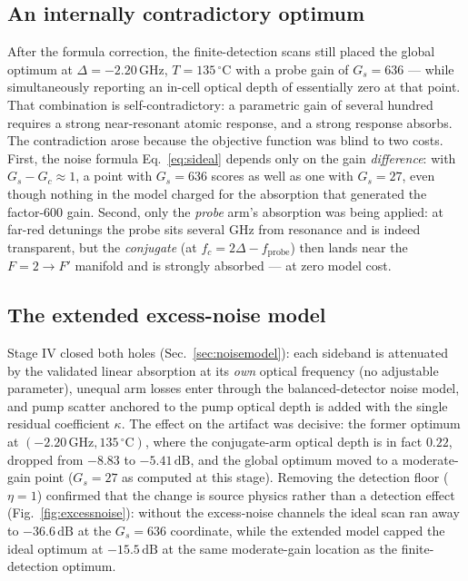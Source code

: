 \documentclass[11pt,a4paper]{article}
\newcommand{\dB}{\,\mathrm{dB}}
\newcommand{\GHz}{\,\mathrm{GHz}}
\newcommand{\degC}{\,^{\circ}\mathrm{C}}
\begin{document}
\subsection{An internally contradictory optimum}
After the formula correction, the finite-detection scans still placed the
global optimum at $\Delta=-2.20\GHz$, $T=135\degC$ with a probe gain of
$G_s=636$ --- while simultaneously reporting an in-cell optical depth of
essentially zero at that point. That combination is self-contradictory: a
parametric gain of several hundred requires a strong near-resonant atomic
response, and a strong response absorbs. The contradiction arose because the
objective function was blind to two costs. First, the noise formula
Eq.~\eqref{eq:sideal} depends only on the gain \emph{difference}: with
$G_s-G_c\approx 1$, a point with $G_s=636$ scores as well as one with
$G_s=27$, even though nothing in the model charged for the absorption that
generated the factor-600 gain. Second, only the \emph{probe} arm's
absorption was being applied: at far-red detunings the probe sits several
GHz from resonance and is indeed transparent, but the \emph{conjugate}
(at $f_c=2\Delta-f_{\mathrm{probe}}$) then lands near the $F{=}2\to F'$
manifold and is strongly absorbed --- at zero model cost.

\subsection{The extended excess-noise model}
Stage IV closed both holes (Sec.~\ref{sec:noisemodel}): each sideband is
attenuated by the validated linear absorption at its \emph{own} optical
frequency (no adjustable parameter), unequal arm losses enter through the
balanced-detector noise model, and pump scatter anchored to the pump optical
depth is added with the single residual coefficient $\kappa$. The effect on
the artifact was decisive: the former optimum at $(-2.20\GHz, 135\degC)$,
where the conjugate-arm optical depth is in fact $0.22$, dropped from
$-8.83$ to $-5.41\dB$, and the global optimum moved to a moderate-gain
point ($G_s=27$ as computed at this stage). Removing the detection floor
($\eta=1$) confirmed that the change is source physics rather than a
detection effect (Fig.~\ref{fig:excessnoise}): without the excess-noise
channels the ideal scan ran away to $-36.6\dB$ at the $G_s=636$ coordinate,
while the extended model capped the ideal optimum at $-15.5\dB$ at the same
moderate-gain location as the finite-detection optimum.
\end{document}
